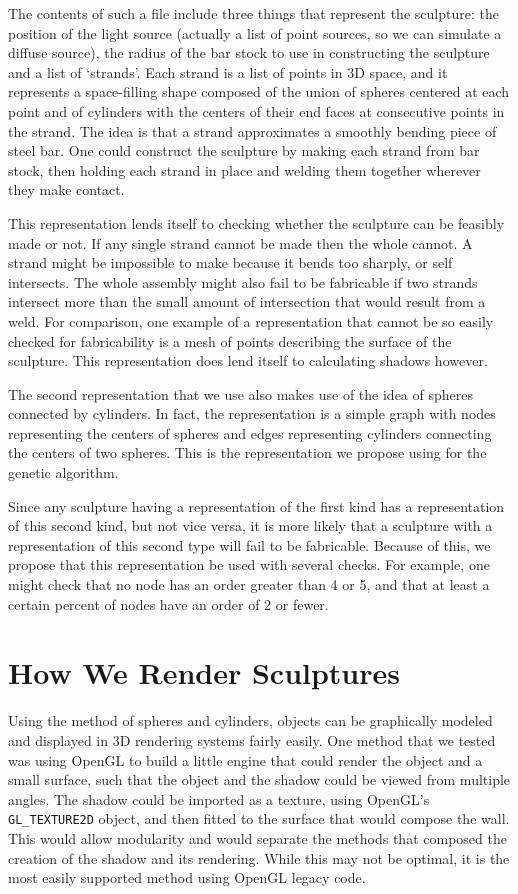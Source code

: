 \documentclass[10pt]{article}
\begin{document}
The contents of such a file include three things that represent the sculpture: the position of the light source (actually a list of point sources, so we can simulate a diffuse source), the radius of the bar stock to use in constructing the sculpture and a list of `strands'. Each strand is a list of points in 3D space, and it represents a space-filling shape composed of the union of spheres centered at each point and of cylinders with the centers of their end faces at consecutive points in the strand. The idea is that a strand approximates a smoothly bending piece of steel bar. One could construct the sculpture by making each strand from bar stock, then holding each strand in place and welding them together wherever they make contact.

This representation lends itself to checking whether the sculpture can be feasibly made or not. If any single strand cannot be made then the whole cannot. A strand might be impossible to make because it bends too sharply, or self intersects. The whole assembly might also fail to be fabricable if two strands intersect more than the small amount of intersection that would result from a weld. For comparison, one example of a representation that cannot be so easily checked for fabricability is a mesh of points describing the surface of the sculpture. This representation does lend itself to calculating shadows however.

The second representation that we use also makes use of the idea of spheres connected by cylinders. In fact, the representation is a simple graph with nodes representing the centers of spheres and edges representing cylinders connecting the centers of two spheres. This is the representation we propose using for the genetic algorithm.

Since any sculpture having a representation of the first kind has a representation of this second kind, but not vice versa, it is more likely that a sculpture with a representation of this second type will fail to be fabricable. Because of this, we propose that this representation be used with several checks. For example, one might check that no node has an order greater than 4 or 5, and that at least a certain percent of nodes have an order of 2 or fewer.

\section{How We Render Sculptures} \label{sculpture_render}
Using the method of spheres and cylinders, objects can be graphically modeled and displayed in 3D rendering systems fairly easily.  One method that we tested was using OpenGL to build a little engine that could render the object and a small surface, such that the object and the shadow could be viewed from multiple angles.  The shadow could be imported as a texture, using OpenGL's \texttt{GL\_TEXTURE2D} object, and then fitted to the surface that would compose the wall.  This would allow modularity and would separate the methods that composed the creation of the shadow and its rendering.  While this may not be optimal, it is the most easily supported method using OpenGL legacy code.
\end{document}
